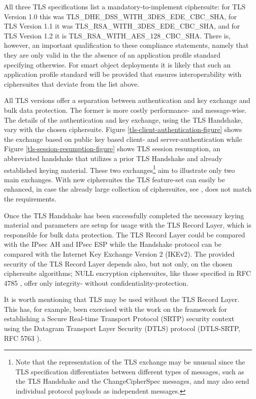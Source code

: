 \documentclass[a4paper, 10pt]{IEEEtran}
\begin{document}
All three TLS specifications list a mandatory-to-implement ciphersuite: for TLS Version 1.0 this was TLS\_DHE\_DSS\_WITH\_3DES\_EDE\_CBC\_SHA, for TLS Version 1.1 it was TLS\_RSA\_WITH\_3DES\_EDE\_CBC\_SHA, and for TLS Version 1.2 it is TLS\_RSA\_WITH\_AES\_128\_CBC\_SHA. There is, however, an important qualification to these compliance statements, namely that they are only valid in the the absence of an application profile standard specifying otherwise. For smart object deployments it is likely that such an application profile standard will be provided that ensures interoperability with ciphersuites that deviate from the list above.  

All TLS versions offer a separation between authentication and key exchange and bulk data protection. The former is more costly performance- and message-wise. The details of the authentication and key exchange, using the TLS Handshake, vary with the chosen ciphersuite. Figure \ref{tls-client-authentication-figure} shows the exchange based on public key based client- and server-authentication while Figure \ref{tls-session-resumption-figure} shows TLS session resumption, an abbreviated handshake that utilizes a prior TLS Handshake and already established keying material. These two exchanges\footnote{Note that the representation of the TLS exchange may be unusual since the TLS specification differentiates between different types of messages, such as the TLS Handshake and the ChangeCipherSpec messages, and may also send individual protocol payloads as independent messages.} aim to illustrate only two main exchanges. With new ciphersuites the TLS feature-set can easily be enhanced, in case the already large collection of ciphersuites, see \cite{TLS-IANA}, does not match the requirements. 

Once the TLS Handshake has been successfully completed the necessary keying material and parameters are setup for usage with the TLS Record Layer, which is responsible for bulk data protection. The TLS Record Layer could be compared with the IPsec AH and IPsec ESP while the Handshake protocol can be compared with the Internet Key Exchange Version 2 (IKEv2). The provided security of the TLS Record Layer depends also, but not only, on the chosen ciphersuite algorithms; NULL encryption ciphersuites, like those specified in RFC 4785 \cite{rfc4785}, offer only integrity- without confidentiality-protection. 

It is worth mentioning that TLS may be used without the TLS Record Layer. This has, for example, been exercised with the work on the framework for establishing a Secure Real-time Transport Protocol (SRTP) security context using the Datagram Transport Layer Security (DTLS) protocol (DTLS-SRTP, RFC 5763 \cite{rfc5763}).
\end{document}
